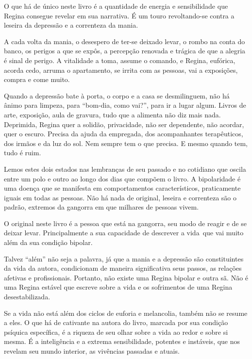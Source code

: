 \asterisc

O que há de único neste livro é a quantidade de energia e sensibilidade
que Regina consegue revelar em sua narrativa. É um touro revoltando-se
contra a leseira da depressão e a correnteza da mania.

A cada volta da mania, o desespero de ter-se deixado levar, o rombo na
conta do banco, os perigos a que se expôs, a percepção renovada e
trágica de que a alegria é sinal de perigo. A vitalidade a toma, assume
o comando, e Regina, eufórica, acorda cedo, arruma o apartamento, se
irrita com as pessoas, vai a exposições, compra e come muito.

Quando a depressão bate à porta, o corpo e a casa se desmilinguem, não
há ânimo para limpeza, para ``bom-dia, como vai?'', para ir a lugar
algum. Livros de arte, exposição, aula de gravura, tudo que a alimenta
não diz mais nada. Deprimida, Regina quer a solidão, privacidade, não
ser dependente, não acordar, quer o escuro. Precisa da ajuda da
empregada, dos acompanhantes terapêuticos, dos irmãos e da luz do sol.
Nem sempre tem o que precisa. E mesmo quando tem, tudo é ruim.

Lemos estes dois estados nas lembranças de seu passado e no cotidiano
que oscila entre um polo e outro ao longo dos dias que compõem o livro.
A bipolaridade é uma doença que se manifesta em comportamentos
característicos, praticamente iguais em todas as pessoas. Não há nada de
original, leseira e correnteza são o padrão, extremos da gangorra em que
milhares de pessoas vivem.

O original neste livro é a pessoa que está na gangorra, seu modo de
reagir e de se deixar levar. Principalmente a sua capacidade de
descrever a vida~que vai muito além da sua condição bipolar.

Talvez ``além'' não seja a palavra, já que a mania e a depressão são
constituintes da vida da autora, condicionam de maneira significativa
seus passos, as relações afetivas e profissionais. Portanto, não existe
uma Regina bipolar e outra sã. Não é uma Regina estável que escreve
sobre a vida e os sofrimentos de uma Regina desestabilizada.

Se a vida não está além dos ciclos de euforia e melancolia, também não
se resume a eles. O que há de cativante na autora do livro, marcada por
sua condição psíquica específica, é a riqueza de seu olhar sobre a vida
ao redor e sobre si mesma. É a inteligência e a extrema sensibilidade,
potentes e instáveis, que nos revelam seu mundo interior, as vivências
passadas e atuais.

